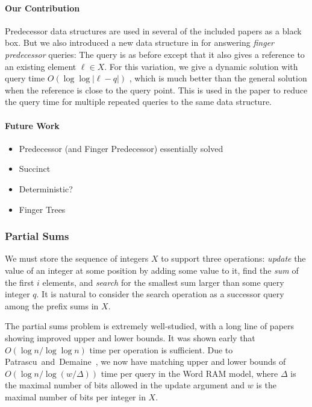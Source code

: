 \paragraph{Our Contribution} 
Predecessor data structures are used in several of the included papers as a black box. But we also introduced a new data structure in  for answering \emph{finger predecessor} queries: The query is as before except that it also gives a reference to an existing element $\ell \in X$. For this variation, we give a dynamic solution with query time $O(\log \log |\ell-q|)$ , which is much better than the general solution when the reference is close to the query point. This is used in the paper to reduce the query time for multiple repeated queries to the same data structure.

\paragraph{Future Work}
\begin{itemize}
    \item Predecessor (and Finger Predecessor) essentially solved
    \item Succinct
    \item Deterministic?
    \item Finger Trees
\end{itemize}


\clearpage
\subsubsection{Partial Sums}
We must store the sequence of integers $X$ to support three operations: \emph{update} the value of an integer at some position by adding some value to it, find the \emph{sum} of the first $i$ elements, and \emph{search} for the smallest sum larger than some query integer $q$. It is natural to consider the search operation as a successor query among the prefix sums in $X$. 

The partial sums problem is extremely well-studied, with a long line of papers showing improved upper and lower bounds. It was shown early that $O(\log n / \log \log n)$ time per operation is sufficient. Due to Patrascu~and~Demaine~\cite{PatrascuDemaine, Others?}, we now have matching upper and lower bounds of $O(\log n / \log (w / \Delta))$  time per query in the Word RAM model, where $\Delta$ is the maximal number of bits allowed in the update argument and $w$ is the maximal number of bits per integer in $X$. 

